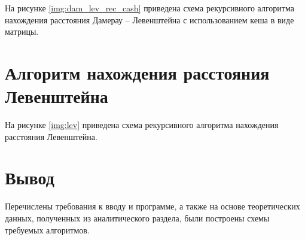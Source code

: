 \FloatBarrier

На рисунке \ref{img:dam_lev_rec_cash} приведена схема рекурсивного алгоритма нахождения расстояния Дамерау -- Левенштейна с использованием кеша в виде матрицы.


\FloatBarrier

\section{Алгоритм нахождения расстояния Левенштейна}

На рисунке \ref{img:lev} приведена схема рекурсивного алгоритма нахождения расстояния Левенштейна.


\FloatBarrier



\section{Вывод}

Перечислены требования к вводу и программе, а также на основе теоретических данных, полученных из аналитического раздела, были построены схемы требуемых алгоритмов.


